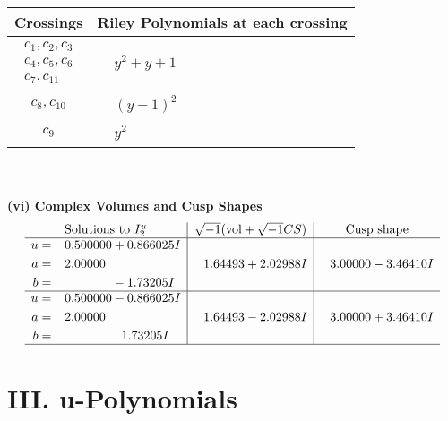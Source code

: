 \documentclass[1p]{elsarticle_modified}
\theoremstyle{definition}
\newcommand{\I}{\sqrt{-1}}
\begin{document}
\begin{tabular}{m{50pt}|m{274pt}}
Crossings & \hspace{64pt}Riley Polynomials at each crossing \\
\hline $$\begin{aligned}c_{1},c_{2},c_{3}\\c_{4},c_{5},c_{6}\\c_{7},c_{11}\end{aligned}$$&$\begin{aligned}
&y^2+y+1
\end{aligned}$\\
\hline $$\begin{aligned}c_{8},c_{10}\end{aligned}$$&$\begin{aligned}
&(y-1)^2
\end{aligned}$\\
\hline $$\begin{aligned}c_{9}\end{aligned}$$&$\begin{aligned}
&y^2
\end{aligned}$\\
\hline
\end{tabular}\\~\\
\newpage\flushleft \textbf{(vi) Complex Volumes and Cusp Shapes}
$$\begin{array}{c|c|c}  
\text{Solutions to }I^u_{2}& \I (\text{vol} + \sqrt{-1}CS) & \text{Cusp shape}\\
 \hline 
\begin{aligned}
u &= \phantom{-}0.500000 + 0.866025 I \\
a &= \phantom{-}2.00000\phantom{ +0.000000I} \\
b &= \phantom{-0.000000 } -1.73205 I\end{aligned}
 & \phantom{-}1.64493 + 2.02988 I & \phantom{-}3.00000 - 3.46410 I \\ \hline\begin{aligned}
u &= \phantom{-}0.500000 - 0.866025 I \\
a &= \phantom{-}2.00000\phantom{ +0.000000I} \\
b &= \phantom{-0.000000 -}1.73205 I\end{aligned}
 & \phantom{-}1.64493 - 2.02988 I & \phantom{-}3.00000 + 3.46410 I\\
 \hline 
 \end{array}$$\newpage
\newpage\renewcommand{\arraystretch}{1}
\centering \section*{ III. u-Polynomials}
\end{document}
